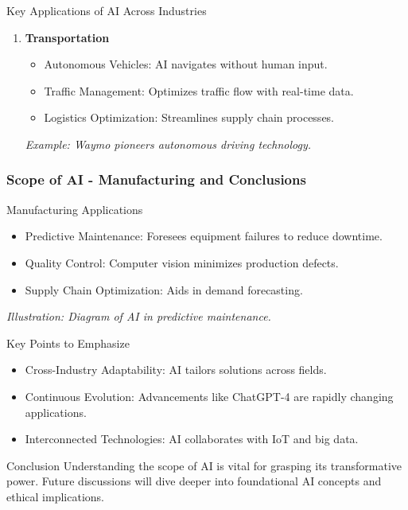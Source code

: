 \documentclass[aspectratio=169]{beamer}
\begin{document}
\begin{frame}[fragile]
\begin{block}{Key Applications of AI Across Industries}
\begin{enumerate}
            \item \textbf{Transportation}
                \begin{itemize}
                    \item Autonomous Vehicles: AI navigates without human input.
                    \item Traffic Management: Optimizes traffic flow with real-time data.
                    \item Logistics Optimization: Streamlines supply chain processes.
                \end{itemize}
                \textit{Example: Waymo pioneers autonomous driving technology.}
        \end{enumerate}
    \end{block}
\end{frame}

\begin{frame}[fragile]
    \frametitle{Scope of AI - Manufacturing and Conclusions}
    \begin{block}{Manufacturing Applications}
        \begin{itemize}
            \item Predictive Maintenance: Foresees equipment failures to reduce downtime.
            \item Quality Control: Computer vision minimizes production defects.
            \item Supply Chain Optimization: Aids in demand forecasting.
        \end{itemize}
        \textit{Illustration: Diagram of AI in predictive maintenance.}
    \end{block}

    \begin{block}{Key Points to Emphasize}
        \begin{itemize}
            \item Cross-Industry Adaptability: AI tailors solutions across fields.
            \item Continuous Evolution: Advancements like ChatGPT-4 are rapidly changing applications.
            \item Interconnected Technologies: AI collaborates with IoT and big data.
        \end{itemize}
    \end{block}

    \begin{block}{Conclusion}
        Understanding the scope of AI is vital for grasping its transformative power. Future discussions will dive deeper into foundational AI concepts and ethical implications.
    \end{block}
\end{frame}
\end{document}
